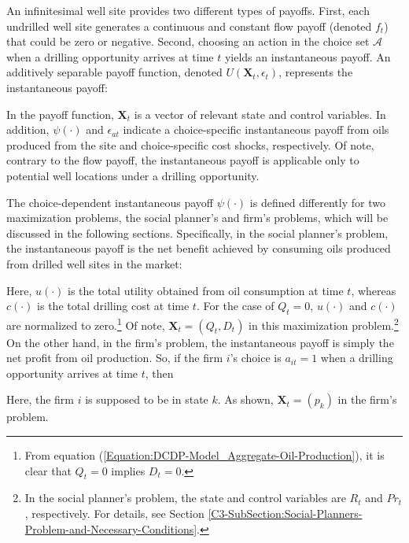 An infinitesimal well site provides two different types of payoffs. First, each undrilled well site generates a continuous and constant flow payoff (denoted $f_{t}$) that could be zero or negative. Second, choosing an action in the choice set $\mathcal{A}$ when a drilling opportunity arrives at time $t$ yields an instantaneous payoff. An additively separable payoff function, denoted $U(\boldsymbol{X}_{t}, \epsilon_{t})$, represents the instantaneous payoff:

In the payoff function, $\boldsymbol{X}_{t}$ is a vector of relevant state and control variables. In addition, $\psi(\cdot)$ and $\epsilon_{at}$ indicate a choice-specific instantaneous payoff from oils produced from the site and choice-specific cost shocks, respectively. Of note, contrary to the flow payoff, the instantaneous payoff is applicable only to potential well locations under a drilling opportunity. 

The choice-dependent instantaneous payoff $\psi(\cdot)$ is defined differently for two maximization problems, the social planner's and firm's problems, which will be discussed in the following sections. Specifically, in the social planner's problem, the instantaneous payoff is the net benefit achieved by consuming oils produced from drilled well sites in the market:

Here, $u(\cdot)$ is the total utility obtained from oil consumption at time $t$, whereas $c(\cdot)$ is the total drilling cost at time $t$. For the case of $Q_{t} = 0$, $u(\cdot)$ and $c(\cdot)$ are normalized to zero.\footnote{From equation (\ref{Equation:DCDP-Model_Aggregate-Oil-Production}), it is clear that $Q_{t} = 0$ implies $D_{t} = 0$.} Of note, $\boldsymbol{X}_{t} = (Q_{t}, D_{t})$ in this maximization problem.\footnote{In the social planner's problem, the state and control variables are $R_{t}$ and $Pr_{t}$, respectively. For details, see Section \ref{C3-SubSection:Social-Planners-Problem-and-Necessary-Conditions}.} On the other hand, in the firm's problem, the instantaneous payoff is simply the net profit from oil production. So, if the firm $i$'s choice is $a_{it} = 1$ when a drilling opportunity arrives at time $t$, then

Here, the firm $i$ is supposed to be in state $k$. As shown, $\boldsymbol{X}_{t} = (p_{k})$ in the firm's problem.

